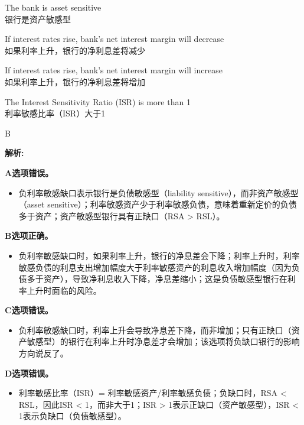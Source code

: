 \documentclass{article}
\newenvironment{explanation}
{\textbf{解析:}\par}
{\par}
\begin{document}
\begin{choices}
    \item The bank is asset sensitive\\
    银行是资产敏感型
    \item If interest rates rise, bank's net interest margin will decrease\\
    如果利率上升，银行的净利息差将减少
    \item If interest rates rise, bank's net interest margin will increase\\
    如果利率上升，银行的净利息差将增加
    \item The Interest Sensitivity Ratio (ISR) is more than 1\\
    利率敏感比率（ISR）大于1
\end{choices}

\begin{correctanswer}
    B
\end{correctanswer}

\begin{explanation}
    \textbf{A选项错误。}
    \begin{itemize}
        \item 负利率敏感缺口表示银行是负债敏感型（liability sensitive），而非资产敏感型（asset sensitive）；利率敏感资产少于利率敏感负债，意味着重新定价的负债多于资产；资产敏感型银行具有正缺口（RSA > RSL）。
    \end{itemize}

    \textbf{B选项正确。}
    \begin{itemize}
        \item 负利率敏感缺口时，如果利率上升，银行的净息差会下降；利率上升时，利率敏感负债的利息支出增加幅度大于利率敏感资产的利息收入增加幅度（因为负债多于资产），导致净利息收入下降，净息差缩小；这是负债敏感型银行在利率上升时面临的风险。
    \end{itemize}

    \textbf{C选项错误。}
    \begin{itemize}
        \item 负利率敏感缺口时，利率上升会导致净息差下降，而非增加；只有正缺口（资产敏感型）的银行在利率上升时净息差才会增加；该选项将负缺口银行的影响方向说反了。
    \end{itemize}

    \textbf{D选项错误。}
    \begin{itemize}
        \item 利率敏感比率（ISR）= 利率敏感资产/利率敏感负债；负缺口时，RSA < RSL，因此ISR < 1，而非大于1；ISR > 1表示正缺口（资产敏感型），ISR < 1表示负缺口（负债敏感型）。
    \end{itemize}
\end{explanation}
\end{document}

